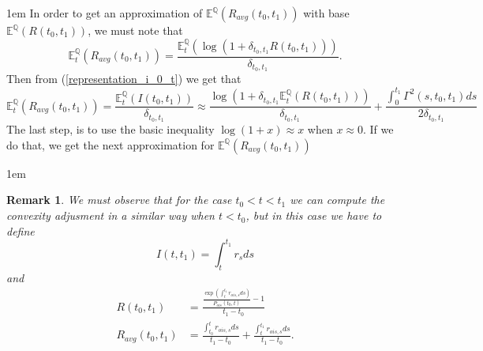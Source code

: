 \documentclass[a4paper,10pt]{article}
\newtheorem{remark}[theorem]{Remark}
\newcommand{\1}{\mathbf{1}}
\begin{document}
\hspace{2cm}
\fboxsep1em
In order to get an approximation of $\mathbb{E}^{\mathbb{Q}}\left(R_{avg}(t_0,t_1)\right)$ with base $\mathbb{E}^{\mathbb{Q}}\left(R(t_0,t_1)\right)$, we must note that 
\begin{equation*}
\mathbb{E}_t^{\mathbb{Q}}\left(R_{avg}(t_0,t_1)\right) = \frac{\mathbb{E}_t^{\mathbb{Q}}\left( \log(1+ \delta_{t_0,t_1} R(t_0,t_1))\right)}{ \delta_{t_0,t_1}}.
\end{equation*}
Then from (\ref{representation_i_0_t}) we get that
\begin{equation}\label{convexity_avg_ois_future}
\mathbb{E}_t^{\mathbb{Q}}\left(R_{avg}(t_0,t_1)\right) = \frac{\mathbb{E}_t^{\mathbb{Q}}\left(I(t_0,t_1)\right) }{\delta_{t_0,t_1}} \approx \frac{\log\left(1+\delta_{t_0,t_1}  \mathbb{E}_t^{\mathbb{Q}}\left(R(t_0,t_1)\right) \right)}{\delta_{t_0,t_1}} + \frac{\int_{0}^{t_1}  \Gamma^{2}(s,t_0,t_1) ds}{2\delta_{t_0,t_1}}
\end{equation}
The last step, is to use the basic inequality $\log(1+x) \approx x$
when $x \approx 0$. If we do that, we get the next approximation for $\mathbb{E}^{\mathbb{Q}}\left(R_{avg}(t_0,t_1)\right)$ 

\fboxsep1em

\begin{remark}
We must observe that for the case $t_0 < t < t_1$ we can compute the convexity adjusment in a similar way when $t < t_0$, but in this case we have to define
\begin{equation*}
I(t,t_1)=\int_{t}^{t_1} r_s ds
\end{equation*}
and 
\begin{align*}
R(t_0,t_1) &= \frac{\frac{\exp(\int_{t}^{t_1} r_{ois,s} ds )}{P_{ois}(t_0,t)} - 1}{t_1 - t_0} \\
R_{avg}(t_0,t_1) &= \frac{\int_{t_0}^{t} r_{ois,s} ds}{t_1-t_0} +  \frac{\int_{t}^{t_1} r_{ois,s} ds}{t_1-t_0}.   
\end{align*}
\end{remark}
\end{document}
